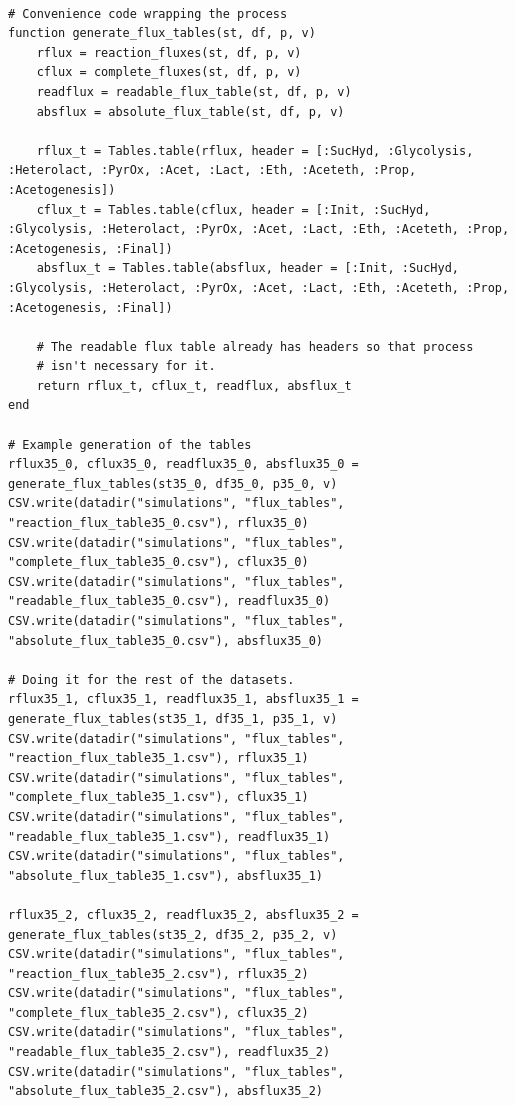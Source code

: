 \documentclass[11pt]{article}
\begin{document}
\begin{verbatim}

# Convenience code wrapping the process
function generate_flux_tables(st, df, p, v)
    rflux = reaction_fluxes(st, df, p, v)
    cflux = complete_fluxes(st, df, p, v)
    readflux = readable_flux_table(st, df, p, v)
    absflux = absolute_flux_table(st, df, p, v)

    rflux_t = Tables.table(rflux, header = [:SucHyd, :Glycolysis, :Heterolact, :PyrOx, :Acet, :Lact, :Eth, :Aceteth, :Prop, :Acetogenesis])
    cflux_t = Tables.table(cflux, header = [:Init, :SucHyd, :Glycolysis, :Heterolact, :PyrOx, :Acet, :Lact, :Eth, :Aceteth, :Prop, :Acetogenesis, :Final])
    absflux_t = Tables.table(absflux, header = [:Init, :SucHyd, :Glycolysis, :Heterolact, :PyrOx, :Acet, :Lact, :Eth, :Aceteth, :Prop, :Acetogenesis, :Final])

    # The readable flux table already has headers so that process
    # isn't necessary for it.
    return rflux_t, cflux_t, readflux, absflux_t
end

# Example generation of the tables
rflux35_0, cflux35_0, readflux35_0, absflux35_0 = generate_flux_tables(st35_0, df35_0, p35_0, v)
CSV.write(datadir("simulations", "flux_tables", "reaction_flux_table35_0.csv"), rflux35_0)
CSV.write(datadir("simulations", "flux_tables", "complete_flux_table35_0.csv"), cflux35_0)
CSV.write(datadir("simulations", "flux_tables", "readable_flux_table35_0.csv"), readflux35_0)
CSV.write(datadir("simulations", "flux_tables", "absolute_flux_table35_0.csv"), absflux35_0)

# Doing it for the rest of the datasets.
rflux35_1, cflux35_1, readflux35_1, absflux35_1 = generate_flux_tables(st35_1, df35_1, p35_1, v)
CSV.write(datadir("simulations", "flux_tables", "reaction_flux_table35_1.csv"), rflux35_1)
CSV.write(datadir("simulations", "flux_tables", "complete_flux_table35_1.csv"), cflux35_1)
CSV.write(datadir("simulations", "flux_tables", "readable_flux_table35_1.csv"), readflux35_1)
CSV.write(datadir("simulations", "flux_tables", "absolute_flux_table35_1.csv"), absflux35_1)

rflux35_2, cflux35_2, readflux35_2, absflux35_2 = generate_flux_tables(st35_2, df35_2, p35_2, v)
CSV.write(datadir("simulations", "flux_tables", "reaction_flux_table35_2.csv"), rflux35_2)
CSV.write(datadir("simulations", "flux_tables", "complete_flux_table35_2.csv"), cflux35_2)
CSV.write(datadir("simulations", "flux_tables", "readable_flux_table35_2.csv"), readflux35_2)
CSV.write(datadir("simulations", "flux_tables", "absolute_flux_table35_2.csv"), absflux35_2)


\end{verbatim}
\end{document}
